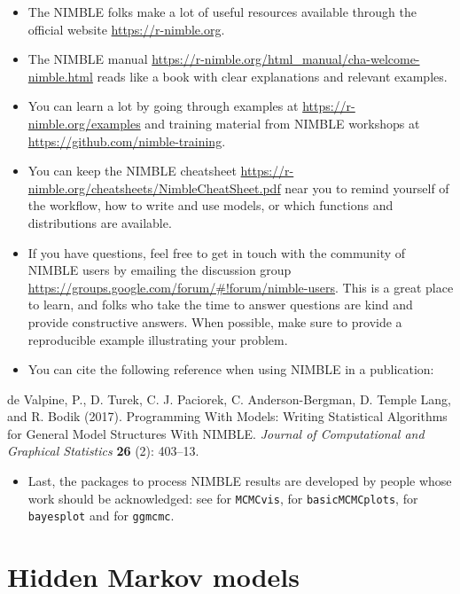 \documentclass[
  12pt,
]{krantz}
\providecommand{\tightlist}{%
  \setlength{\itemsep}{0pt}\setlength{\parskip}{0pt}}
\renewenvironment{quote}{\begin{VF}}{\end{VF}}
\begin{document}
\begin{itemize}
\item
  The NIMBLE folks make a lot of useful resources available through the official website \url{https://r-nimble.org}.
\item
  The NIMBLE manual \url{https://r-nimble.org/html_manual/cha-welcome-nimble.html} reads like a book with clear explanations and relevant examples.
\item
  You can learn a lot by going through examples at \url{https://r-nimble.org/examples} and training material from NIMBLE workshops at \url{https://github.com/nimble-training}.
\item
  You can keep the NIMBLE cheatsheet \url{https://r-nimble.org/cheatsheets/NimbleCheatSheet.pdf} near you to remind yourself of the workflow, how to write and use models, or which functions and distributions are available.
\item
  If you have questions, feel free to get in touch with the community of NIMBLE users by emailing the discussion group \url{https://groups.google.com/forum/\#!forum/nimble-users}. This is a great place to learn, and folks who take the time to answer questions are kind and provide constructive answers. When possible, make sure to provide a reproducible example illustrating your problem.
\item
  You can cite the following reference when using NIMBLE in a publication:
\end{itemize}

\begin{quote}
de Valpine, P., D. Turek, C. J. Paciorek, C. Anderson-Bergman, D. Temple Lang, and R. Bodik (2017). Programming With Models: Writing Statistical Algorithms for General Model Structures With NIMBLE. \emph{Journal of Computational and Graphical Statistics} \textbf{26} (2): 403--13.
\end{quote}

\begin{itemize}
\tightlist
\item
  Last, the packages to process NIMBLE results are developed by people whose work should be acknowledged: see \citet{youngflesh2018mcmcvis} for \texttt{MCMCvis}, \citet{turek2022basicmcmcplots} for \texttt{basicMCMCplots}, \citet{gabry2022bayesplot} for \texttt{bayesplot} and \citet{fernandez2016ggmcmc} for \texttt{ggmcmc}.
\end{itemize}

\chapter{Hidden Markov models}\label{hmmcapturerecapture}
\end{document}
